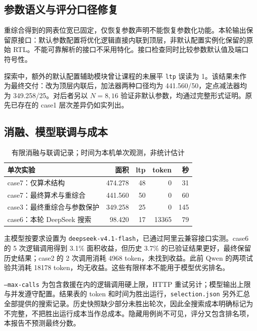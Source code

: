\documentclass[UTF8,a4paper,zihao=5]{ctexart}
\newcommand{\code}[1]{\texttt{#1}}
\begin{document}
\subsection{参数语义与评分口径修复}
重综合得到的网表位宽已固定，仅恢复参数声明不能恢复参数化功能。本轮输出保留原接口：默认参数配置将优化逻辑直接内联到顶层，非默认配置实例化保留的原始 RTL。不能可靠解析的接口不采用特化。接口检查同时比较参数默认值及端口符号性。

探索中，额外的默认配置辅助模块曾让课程的未展平 \code{ltp} 误读为 1。该结果未作为最终交付：改为顶层内联后，加法器两种口径均为 441.560/50，定点减法器均为 349.258/25。对后者另以 $N=8,16$ 验证非默认参数，均通过完整形式证明。原先已存在的 case1 层次差异仍如实列出。

\subsection{消融、模型联调与成本}
\begin{table}[h]\centering\small
\begin{tabular}{@{}lrrrr@{}}
\toprule
单次实验 & 面积 & ltp & token & 秒 \\\midrule
case7：仅算术结构 & 474.278 & 48 & 0 & 31 \\
case7：最终算术与重综合 & 441.560 & 50 & 0 & 60 \\
case3：最终重综合与参数保护 & 349.258 & 25 & 0 & 145 \\
case6：本轮 DeepSeek 搜索 & 98.420 & 17 & 13365 & 79 \\
\bottomrule
\end{tabular}
\caption{有限消融与联调记录；时间为本机单次观测，非统计估计}
\end{table}
主模型按要求设置为 \code{deepseek-v4.1-flash}，已通过阿里云兼容接口实测。case6 的 5 次逻辑调用得到 3.1\% 面积收益，但历史 3.7\% 的已验证结果更好，最终保留历史结果；case2 的 2 次调用消耗 4968 token，未找到收益。此前 Qwen 的两项试验共消耗 18178 token，均无收益。这些有限样本不能用于模型优劣排名。

\code{--max-calls} 为包含救援在内的逻辑调用硬上限，HTTP 重试另计；模型输出上限与并发遵守配置。结果表的 token 和时间为胜出运行，\code{selection.json} 另外汇总全部提供的搜索记录。历史快照缺少部分未胜出轮次，因此全搜索成本明确标记为不完整，不把胜出运行成本当作总成本。隐藏用例尚不可见，评分又包含排名项，本报告不预测最终分数。
\end{document}
